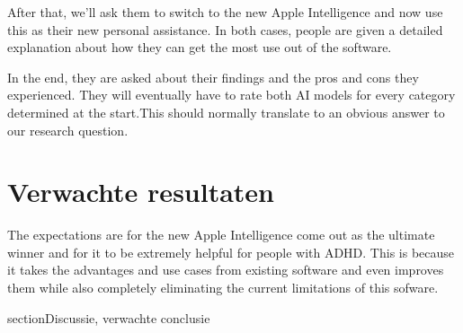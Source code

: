 \documentclass[english]{hogent-article}
\begin{document}
After that, we'll ask them to switch to the new Apple Intelligence and now use this as their new personal assistance. In both cases, people are given a detailed explanation about how they can get the most use out of the software. 

In the end, they are asked about their findings and the pros and cons they experienced. They will eventually have to rate both AI models for every category determined at the start.This should normally translate to an obvious answer to our research question.


%
%
%

\section{Verwachte resultaten}%
\label{sec:verwachte-resultaten}


The expectations are for the new Apple Intelligence come out as the ultimate winner and for it to be extremely helpful for people with ADHD. This is because it takes the advantages and use cases from existing software and even improves them while also completely eliminating the current limitations of this sofware.


section{Discussie, verwachte conclusie}%
\label{sec:discussie-conclusie}



\printbibliography[heading=bibintoc]
\end{document}
